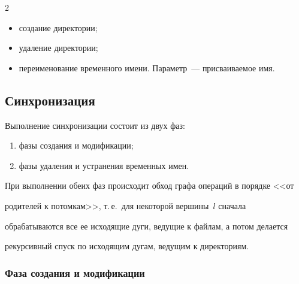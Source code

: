 \begin{multicols}{2}
\begin{itemize}
\item создание директории;\\[-15pt]


\item удаление директории;\\[-15pt]


\item переименование временного имени. Параметр~--- присваиваемое имя.


\end{itemize}





\vspace*{-6pt}





\subsection{Синхронизация}





      Выполнение синхронизации состоит из двух фаз:


      \begin{enumerate}[(1)]


\item фазы создания и модификации;\\[-14pt]


\item фазы удаления и устранения временных имен.


\end{enumerate}





При выполнении обеих фаз происходит обход графа операций в порядке <<от 


родителей к потомкам>>, т.\,е.\ для некоторой вершины~$l$ сначала 


обрабатываются все ее исходящие дуги, ведущие к файлам, а потом делается 


рекурсивный спуск по исходящим дугам, ведущим к директориям.





\vspace*{-3pt}


\subsubsection{Фаза создания и модификации} %



\end{multicols}
